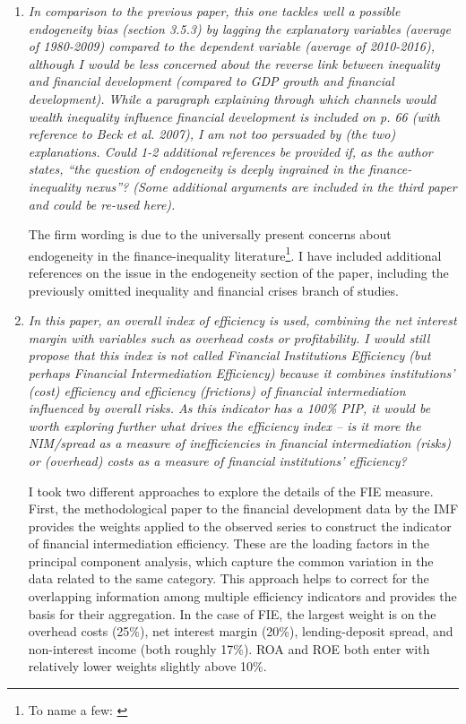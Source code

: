 \begin{enumerate}[resume]

    \item \textit{In comparison to the previous paper, this one tackles well a possible endogeneity bias (section 3.5.3) by lagging the explanatory variables (average of 1980-2009) compared to the dependent variable (average of 2010-2016), although I would be less concerned about the reverse link between inequality and financial development (compared to GDP growth and financial development). While a paragraph explaining through which channels would wealth inequality influence financial development is included on p. 66 (with reference to Beck et al. 2007), I am not too persuaded by (the two) explanations. Could 1-2 additional references be provided if, as the author states, ``the question of endogeneity is deeply ingrained in the finance-inequality nexus''? (Some additional arguments are included in the third paper and could be re-used here).}
    
    The firm wording is due to the universally present concerns about endogeneity in the finance-inequality literature\footnote{To name a few: \textcite{cihaksahay2020,de2017finance,goda2017income,bazillier2017circular,kumhof2015inequality,mookerjee2010availability}}. I have included additional references on the issue in the endogeneity section of the paper, including the previously omitted inequality and financial crises branch of studies.
        
    \item \textit{In this paper, an overall index of efficiency is used, combining the net interest margin with variables such as overhead costs or profitability. I would still propose that this index is not called Financial Institutions Efficiency (but perhaps Financial Intermediation Efficiency) because it combines institutions' (cost) efficiency and efficiency (frictions) of financial intermediation influenced by overall risks. As this indicator has a 100\% PIP, it would be worth exploring further what drives the efficiency index -- is it more the NIM/spread as a measure of inefficiencies in financial intermediation (risks) or (overhead) costs as a measure of financial institutions' efficiency?}
    
    I took two different approaches to explore the details of the FIE measure. First, the methodological paper to the financial development data by the IMF \parencite{svirydzenka2016introducing} provides the weights applied to the observed series to construct the indicator of financial intermediation efficiency. These are the loading factors in the principal component analysis, which capture the common variation in the data related to the same category. This approach helps to correct for the overlapping information among multiple efficiency indicators and provides the basis for their aggregation. In the case of FIE, the largest weight is on the overhead costs (25\%), net interest margin (20\%), lending-deposit spread, and non-interest income (both roughly 17\%). ROA and ROE both enter with relatively lower weights slightly above 10\%.


\end{enumerate}
